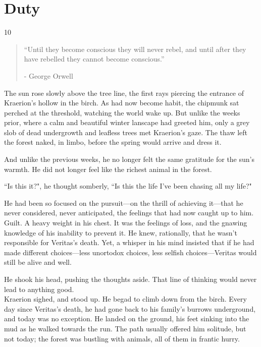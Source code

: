 \chapter{Duty}

\vspace{-1.3cm}
\begin{localsize}{10}
    \begin{quote}
        “Until they become conscious they will never rebel, and until after they have rebelled they cannot become conscious.”
        \begin{flushright}- George Orwell \end{flushright}
    \end{quote}
\end{localsize}
\vspace{1cm}


The sun rose slowly above the tree line, the first rays piercing the entrance of Kraerion's hollow in the birch. As had now become habit, the chipmunk sat perched at the threshold, watching the world wake up.
But unlike the weeks prior, where a calm and beautiful winter lanscape had greeted him, only a grey slob of dead undergrowth and leafless trees met Kraerion's gaze. The thaw left the forest naked, in limbo, before the spring would arrive and dress it.

And unlike the previous weeks, he no longer felt the same gratitude for the sun's warmth. He did not longer feel like the richest animal in the forest.

``Is this it?", he thought somberly, ``Is this the life I've been chasing all my life?"

He had been so focused on the pursuit---on the thrill of achieving it---that he never considered, never anticipated, the feelings that had now caught up to him. Guilt. A heavy weight in his chest. It was the feelings of loss, and the gnawing knowledge of his inability to prevent it. He knew, rationally, that he wasn't responsible for Veritas's death. Yet, a whisper in his mind insisted that if he had made different choices---less unortodox choices, less selfish choices---Veritas would still be alive and well.

He shook his head, pushing the thoughts aside. That line of thinking would never lead to anything good.\\

Kraerion sighed, and stood up. He begad to climb down from the birch. Every day since Veritas's death, he had gone back to his family's burrows underground, and today was no exception.
He landed on the ground, his feet sinking into the mud as he walked towards the run. The path usually offered him solitude, but not today; the forest was bustling with animals, all of them in frantic hurry.

